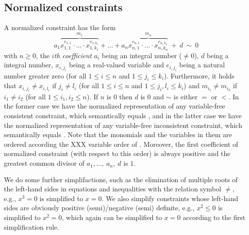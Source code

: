 \subsection{Normalized constraints}
A normalized constraint has the form
\[a_1\overbrace{x_{1,1}^{e_{1,1}}\cdot\ldots\cdot x_{1,k_1}^{e_{1,k_1}}}^{m_1}+\ldots+a_n\overbrace{x_{n,1}^{e_{n,1}}\cdot\ldots\cdot x_{n,k_n}^{e_{n,k_n}}}^{m_n}\ + \ d\ \sim \ 0\]
with $n\geq0$, the \emph{$i$th coefficient} $a_i$ being an integral number ($\neq 0$), $d$ being a integral number, $x_{i,j_i}$ being a real-valued variable and $e_{i,j_i}$ being a natural number greater zero (for all $1\leq i\leq n$ and $1\leq j_i\leq k_i$). Furthermore, it holds that
$x_{i,j_i}\neq x_{i,l_i}$ if $j_i\neq l_i$ (for all $1\leq i\leq n$ and $1\leq j_i, l_i\leq k_i$) and $m_{i_1}\neq m_{i_2}$ if $i_1\neq i_2$ (for all $1\leq i_1,i_2\leq n$). If $n$ is $0$ then $d$ is $0$ and $\sim$ is either $=$ or $<$. In the former case we have the normalized representation of any variable-free consistent constraint, which semantically equals \true, and in the latter case we have the normalized representation of any variable-free inconsistent constraint, which semantically equals \false. Note that the monomials and the variables in them are ordered according the XXX variable order of \carl.
Moreover, the first coefficient of normalized constraint (with respect to this order) is always positive and the greatest common divisor of $a_1,\ldots,\ a_n,\ d$ is $1$.

We do some further simplifactions, such as the elimination of multiple roots of the left-hand sides in equations and inequalities with the relation symbol $\neq$, e.g., $x^3=0$ is simplified to $x=0$. We also simplify constraints whose left-hand sides are obviously positive (semi)/negative (semi) definite, e.g., $x^2\leq 0$ is simplified to $x^2=0$, which again can be simplified to $x=0$ according to the first simplification rule.

